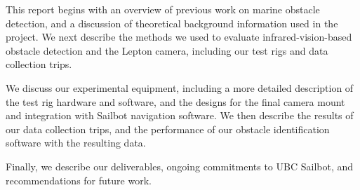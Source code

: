 This report begins with an overview of previous work on marine obstacle detection, and a discussion of theoretical background information used in the project.  We next describe the methods we used to evaluate infrared-vision-based obstacle detection and the Lepton camera, including our test rigs and data collection trips.

We discuss our experimental equipment, including a more detailed description of the test rig hardware and software, and the designs for the final camera mount and integration with Sailbot navigation software.  We then describe the results of our data collection trips, and the performance of our obstacle identification software with the resulting data.

Finally, we describe our deliverables, ongoing commitments to UBC Sailbot, and recommendations for future work.


